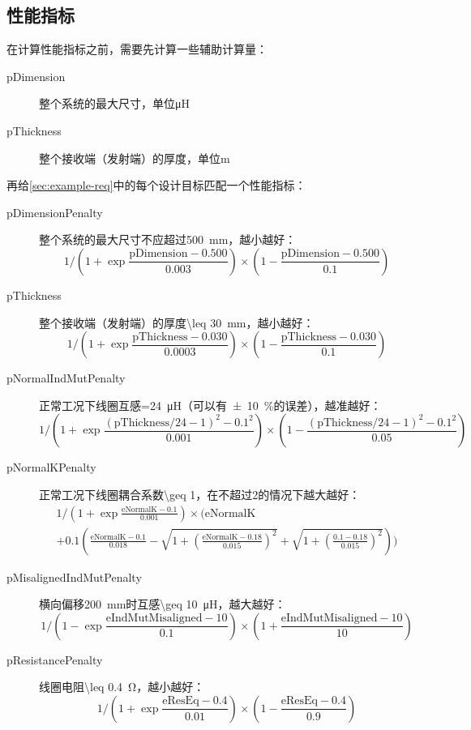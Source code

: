 \documentclass[index]{subfiles}
\begin{document}
\subsection{性能指标}
在计算性能指标之前，需要先计算一些辅助计算量：
\begin{description}
  \item[pDimension] 整个系统的最大尺寸，单位\si{\micro\henry}
  \item[pThickness] 整个接收端（发射端）的厚度，单位\si{\metre}
\end{description}
再给\cref{sec:example-req}中的每个设计目标匹配一个性能指标：
\begin{description}
  \item[pDimensionPenalty] 整个系统的最大尺寸不应超过\SI{500}{\milli\metre}，越小越好：
  \[1{\Big/}\!\left(1+\exp \frac{\text{pDimension}-0.500}{0.003}\right)\times\left(1 - \frac{\text{pDimension}-0.500}{0.1}\right)\]
  \item[pThickness] 整个接收端（发射端）的厚度\SI{\leq 30}{\milli\metre}，越小越好：
  \[1{\Big/}\!\left(1+\exp \frac{\text{pThickness}-0.030}{0.0003}\right)\times\left(1 - \frac{\text{pThickness}-0.030}{0.1}\right)\]
  \item[pNormalIndMutPenalty] 正常工况下线圈互感\SI{=24}{\micro\henry}（可以有\SI{\pm 10}{\percent}的误差），越准越好：
  \[1{\Big/}\!\left(1+\exp \frac{(\text{pThickness}/24-1)^2-0.1^2}{0.001}\right)\times\left(1 - \frac{(\text{pThickness}/24-1)^2-0.1^2}{0.05}\right)\]
  \item[pNormalKPenalty] 正常工况下线圈耦合系数\num{\geq 1}，在不超过2的情况下越大越好：
  \[
  \begin{multlined}
  1{\Big/}\!\left(1+\exp \frac{\text{eNormalK}-0.1}{0.001}\right)\times{\Bigg(}\text{eNormalK} \\
  + 0.1\left(\frac{\text{eNormalK}-0.1}{0.018} - \sqrt{1+\left(\textstyle\frac{\text{eNormalK}-0.18}{0.015}\right)^2}
  + \sqrt{1+\left(\textstyle\frac{0.1-0.18}{0.015}\right)^2}\right){\Bigg)}
  \end{multlined}
  \]
  \item[pMisalignedIndMutPenalty] 横向偏移\SI{200}{\milli\metre}时互感\SI{\geq 10}{\micro\henry}，越大越好：
  \[1{\Big/}\!\left(1-\exp \frac{\text{eIndMutMisaligned}-10}{0.1}\right)\times\left(1 + \frac{\text{eIndMutMisaligned}-10}{10}\right)\]
  \item[pResistancePenalty] 线圈电阻\SI{\leq 0.4}{\ohm}，越小越好：
  \[1{\Big/}\!\left(1+\exp \frac{\text{eResEq}-0.4}{0.01}\right)\times\left(1 - \frac{\text{eResEq}-0.4}{0.9}\right)\]
\end{description}
\end{document}
